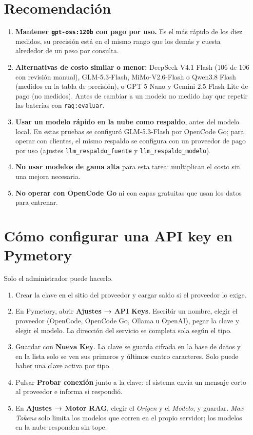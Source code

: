 \documentclass[letterpaper,11pt]{article}
\begin{document}
\section{Recomendación}

\begin{enumerate}[nosep]
\item \textbf{Mantener \texttt{gpt-oss:120b} con pago por uso.} Es el más rápido de los diez medidos, su precisión está en el mismo rango que los demás y cuesta alrededor de un peso por consulta.
\item \textbf{Alternativas de costo similar o menor:} DeepSeek V4.1 Flash (106 de 106 con revisión manual), GLM-5.3-Flash, MiMo-V2.6-Flash o Qwen3.8 Flash (medidos en la tabla de precisión), o GPT 5 Nano y Gemini 2.5 Flash-Lite de pago (no medidos). Antes de cambiar a un modelo no medido hay que repetir las baterías con \texttt{rag:evaluar}.
\item \textbf{Usar un modelo rápido en la nube como respaldo}, antes del modelo local. En estas pruebas se configuró GLM-5.3-Flash por OpenCode Go; para operar con clientes, el mismo respaldo se configura con un proveedor de pago por uso (ajustes \texttt{llm\_respaldo\_fuente} y \texttt{llm\_respaldo\_modelo}).
\item \textbf{No usar modelos de gama alta} para esta tarea: multiplican el costo sin una mejora necesaria.
\item \textbf{No operar con OpenCode Go} ni con capas gratuitas que usan los datos para entrenar.
\end{enumerate}

\section{Cómo configurar una API key en Pymetory}

Solo el administrador puede hacerlo.

\begin{enumerate}[nosep]
\item Crear la clave en el sitio del proveedor y cargar saldo si el proveedor lo exige.
\item En Pymetory, abrir \textbf{Ajustes → API Keys}. Escribir un nombre, elegir el proveedor (OpenCode, OpenCode Go, Ollama u OpenAI), pegar la clave y elegir el modelo. La dirección del servicio se completa sola según el tipo.
\item Guardar con \textbf{Nueva Key}. La clave se guarda cifrada en la base de datos y en la lista solo se ven sus primeros y últimos cuatro caracteres. Solo puede haber una clave activa por tipo.
\item Pulsar \textbf{Probar conexión} junto a la clave: el sistema envía un mensaje corto al proveedor e informa si respondió.
\item En \textbf{Ajustes → Motor RAG}, elegir el \emph{Origen} y el \emph{Modelo}, y guardar. \emph{Max Tokens} solo limita los modelos que corren en el propio servidor; los modelos en la nube responden sin tope.
\end{enumerate}
\end{document}
